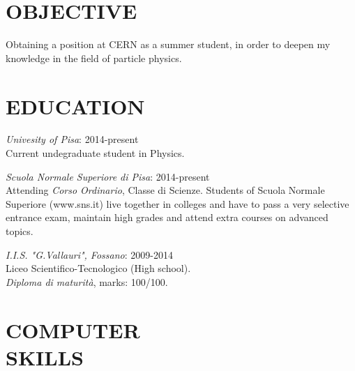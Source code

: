 \documentclass[margin, 10pt]{res} %
\begin{document}
\begin{resume}

 
\section{OBJECTIVE}  


Obtaining a position at CERN as a summer student, in order to deepen my knowledge in the field of particle physics.


\section{EDUCATION}

{\sl Univesity of Pisa}:   \hfill 2014-present \\
Current undegraduate student in Physics.

{\sl Scuola Normale Superiore di Pisa}: \hfill 2014-present \\
Attending \textit{Corso Ordinario}, Classe di Scienze.
Students of Scuola Normale Superiore (www.sns.it) live together in colleges and have to pass a very selective entrance exam, maintain high grades and attend extra courses on advanced topics.

{\sl I.I.S. "G.Vallauri", Fossano}:  \hfill 2009-2014 \\
Liceo Scientifico-Tecnologico (High school).\\ 
\textit{Diploma di maturit\`a}, marks: 100/100.


 

\section{COMPUTER \\ SKILLS} 


\end{resume}
\end{document}
